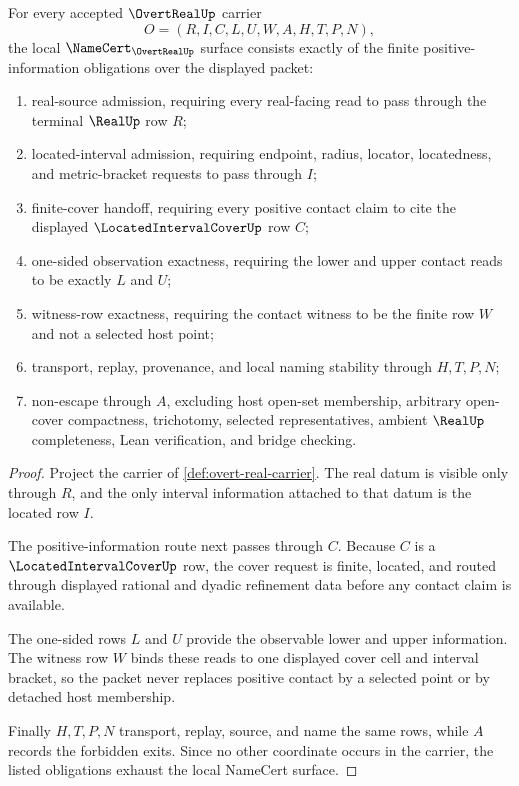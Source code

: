 \begin{theorem}
\label{thm:overt-real-namecert-obligations}
For every accepted $\OvertRealUp$ carrier
$$
O=(R,I,C,L,U,W,A,H,T,P,N),
$$
the local $\NameCert_{\OvertRealUp}$ surface consists exactly of the finite positive-information obligations over the displayed packet:
\begin{enumerate}
\item real-source admission, requiring every real-facing read to pass through the terminal $\RealUp$ row $R$;
\item located-interval admission, requiring endpoint, radius, locator, locatedness, and metric-bracket requests to pass through $I$;
\item finite-cover handoff, requiring every positive contact claim to cite the displayed $\LocatedIntervalCoverUp$ row $C$;
\item one-sided observation exactness, requiring the lower and upper contact reads to be exactly $L$ and $U$;
\item witness-row exactness, requiring the contact witness to be the finite row $W$ and not a selected host point;
\item transport, replay, provenance, and local naming stability through $H,T,P,N$;
\item non-escape through $A$, excluding host open-set membership, arbitrary open-cover compactness, trichotomy, selected representatives, ambient $\RealUp$ completeness, Lean verification, and bridge checking.
\end{enumerate}
\end{theorem}
\begin{proof}
Project the carrier of \autoref{def:overt-real-carrier}. The real datum is visible only through $R$, and the only interval information attached to that datum is the located row $I$.

The positive-information route next passes through $C$. Because $C$ is a $\LocatedIntervalCoverUp$ row, the cover request is finite, located, and routed through displayed rational and dyadic refinement data before any contact claim is available.

The one-sided rows $L$ and $U$ provide the observable lower and upper information. The witness row $W$ binds these reads to one displayed cover cell and interval bracket, so the packet never replaces positive contact by a selected point or by detached host membership.

Finally $H,T,P,N$ transport, replay, source, and name the same rows, while $A$ records the forbidden exits. Since no other coordinate occurs in the carrier, the listed obligations exhaust the local NameCert surface.
\end{proof}

